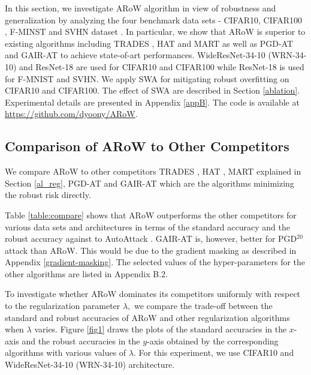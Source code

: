 \documentclass[nohyperref]{article}
\theoremstyle{plain}
\theoremstyle{definition}
\theoremstyle{remark}
\begin{document}
In this section, we investigate ARoW algorithm in view of robustness and generalization by analyzing the four benchmark data sets - CIFAR10, CIFAR100 \citep{krizhevsky09learningmultiple} , F-MINST \citep{xiao2017fahsion} and SVHN dataset \citep{netzer2011svhn}.
In particular, we show that ARoW is superior to existing algorithms including TRADES \citep{zhang2019theoretically}, HAT \citep{rade2022reducing} and MART \citep{wang2020improving}
as well as PGD-AT \citep{madry2018towards} and GAIR-AT \citep{zhang2021geometry}
to achieve state-of-art performances.
WideResNet-34-10 (WRN-34-10) \citep{zagoruyko2016wide} 
and ResNet-18 \citep{he2016deep} are used for CIFAR10 and CIFAR100 while 
ResNet-18 \citep{he2016deep} is used for F-MNIST and SVHN.
We apply SWA for mitigating robust overfitting \cite{chen2021robust} on CIFAR10 and CIFAR100. The effect of SWA are described in Section \ref{ablation}.
Experimental details are presented in Appendix \ref{appB}.
The code is available at \href{https://github.com/dyoony/ARoW}{https://github.com/dyoony/ARoW}.

\subsection{Comparison of ARoW to Other Competitors}
\label{sec4_1}
We compare ARoW to other competitors
TRADES \citep{zhang2019theoretically}, HAT \citep{rade2022reducing}, MART \citep{wang2020improving} explained in Section \ref{al_reg},
PGD-AT \citep{madry2018towards} and GAIR-AT \citep{zhang2021geometry} which are the algorithms  minimizing the robust risk directly.

Table \ref{table:compare} shows that 
ARoW outperforms the other competitors for various data sets and architectures
in terms of the standard accuracy and the robust accuracy against to AutoAttack \citep{croce2020reliable}.
GAIR-AT is, however, better for PGD$^{20}$ attack than ARoW.
This would be due to the gradient masking \citep{papernot2016science, papernot2017practical} as described in Appendix \ref{gradient-masking}.
The selected values of the hyper-parameters for the other algorithms are listed in Appendix B.2.

To investigate whether ARoW dominates its competitors uniformly with respect to the regularization 
parameter $\lambda,$ we compare the trade-off between the standard and robust accuracies of ARoW
and other regularization algorithms when $\lambda$ varies.
Figure \ref{fig1} draws the plots of the standard accuracies 
in the $x$-axis and the robust accuracies in the $y$-axis obtained by the corresponding algorithms with
various values of $\lambda.$ For this experiment, we use CIFAR10 and WideResNet-34-10 (WRN-34-10) architecture.
\end{document}
